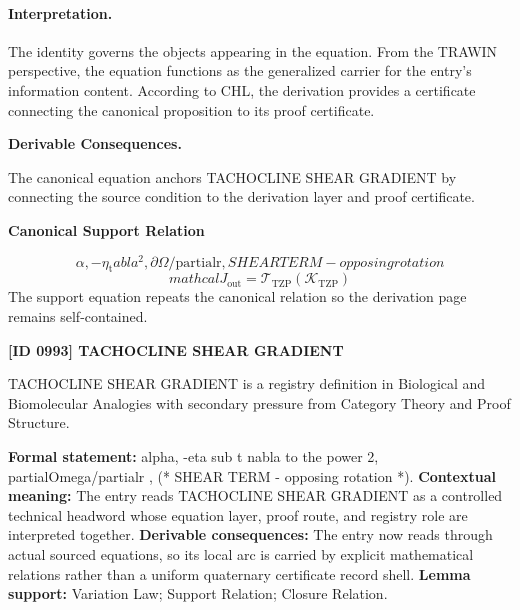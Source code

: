 \paragraph{Interpretation.}
The identity governs the objects appearing in the equation. From the TRAWIN perspective, the equation functions as the generalized carrier for the entry’s information content. According to CHL, the derivation provides a certificate connecting the canonical proposition to its proof certificate.

\par\vspace{0.35em}
\noindent\textbf{Derivable Consequences.}\quad
\begingroup
\footnotesize
\raggedright
The canonical equation anchors TACHOCLINE SHEAR GRADIENT by connecting the source condition to the derivation layer and proof certificate.
\par\endgroup

\noindent\textbf{Canonical Support Relation}\par
\[
{\alpha, -\eta_{\mathrm{t}}  abla^{2}, \partial\Omega/\mathrm{partialr}}, SHEAR TERM - opposing rotation
\]
\[
mathcal{J}_{\mathrm{out}} = \mathcal{T}_{\mathrm{TZP}}\!\left(\mathcal{K}_{\mathrm{TZP}}\right)
\]
\noindent The support equation repeats the canonical relation so the derivation page remains self-contained.\par

\clearpage
\noindent\textbf{[ID 0993] TACHOCLINE SHEAR GRADIENT}\par
\vspace{0.35em}
\begingroup\small
{}
TACHOCLINE SHEAR GRADIENT is a registry definition in Biological and Biomolecular Analogies with secondary pressure from Category Theory and Proof Structure.

\begingroup\footnotesize\setlength{\emergencystretch}{3em}\sloppy
\textbf{Formal statement:} alpha, -eta sub t nabla to the power 2, partialOmega/partialr , (* SHEAR TERM - opposing rotation *). \textbf{Contextual meaning:} The entry reads TACHOCLINE SHEAR GRADIENT as a controlled technical headword whose equation layer, proof route, and registry role are interpreted together. \textbf{Derivable consequences:} The entry now reads through actual sourced equations, so its local arc is carried by explicit mathematical relations rather than a uniform quaternary certificate record shell. \textbf{Lemma support:} Variation Law; Support Relation; Closure Relation.\par
\endgroup

